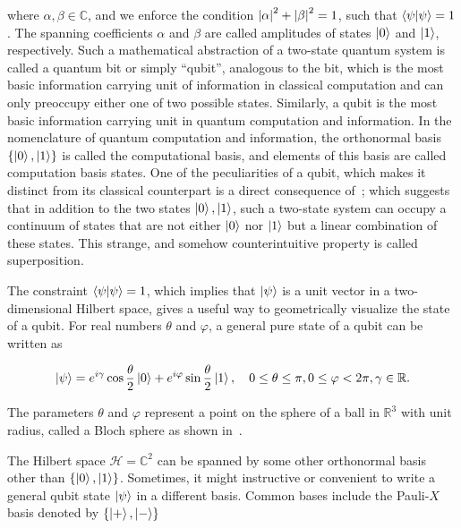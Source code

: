 \noindent
where $\alpha, \beta \in \mathbb{C}$, and we enforce the condition $\abs{\alpha}^2 + \abs{\beta}^2 = 1$, such that $\braket{\psi}{\psi} = 1$. The spanning coefficients $\alpha$ and $\beta$ are called amplitudes of  states $\ket{0}$ and $\ket{1}$, respectively. Such a mathematical abstraction of a two-state quantum system is called a quantum bit or simply \enquote{qubit}, analogous to the bit, which is the most basic information carrying unit of information in classical computation and can only preoccupy either one of two possible states. Similarly, a qubit is the most basic information carrying unit in quantum computation and information. In the nomenclature of quantum computation and information, the orthonormal basis $\{\ket{0},\ket{1}\}$ is called the computational basis, and elements of this basis are called computation basis states. One of the peculiarities of a qubit, which makes it distinct from its classical counterpart is a direct consequence of~; which suggests that in addition to the two states $\ket{0},\ket{1}$, such a two-state system can occupy a continuum of states that are not either $\ket{0}$ nor $\ket{1}$ but a linear combination of these states. This strange, and somehow counterintuitive property is called superposition.


\bigskip
\noindent
The constraint $\ip{\psi}=1$, which implies that $\ket{\psi}$ is a unit vector in a two-dimensional Hilbert space, gives a useful way to geometrically visualize the state of a qubit. For real numbers $\theta$ and $\varphi$, a general pure state of a qubit can be written as 

\begin{align*}
	\ket{\psi} = e^{i\gamma}\cos{\frac{\theta}{2}}\ket{0} +
		e^{i\varphi}
	\sin{\frac{\theta}{2}}\ket{1}, \quad 0 \leq \theta \leq \pi, 0 \leq
	\varphi < 2\pi, \gamma \in \mathbb{R}.
\end{align*}

\noindent
The parameters $\theta$ and $\varphi$ represent a point on the sphere of a ball
in $\mathbb{R}^3$ with unit radius, called a Bloch sphere as shown in~.

\bigskip
\noindent
The Hilbert space $\mathcal{H} = \mathbb{C}^{2}$ can be spanned by some other orthonormal basis other than $\{\ket{0},\ket{1}\}$. Sometimes, it might instructive or convenient to write a general qubit state $\ket{\psi}$ in a different basis. Common bases include the Pauli-$X$ basis denoted by $\{\ket{+}, \ket{-}\}$

